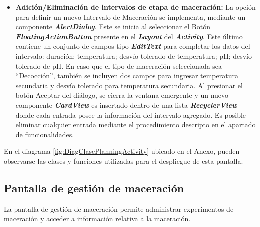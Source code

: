 \begin{itemize}
                    \item \textbf{Adición/Eliminación de intervalos de etapa de maceración:} La opción para definir un nuevo Intervalo de Maceración se implementa, mediante un componente \textbf{\textit{\gls{AlertDialog}}}. Este se inicia al seleccionar el Botón \textbf{\textit{\gls{FloatingActionButton}}} presente en el \textbf{\textit{\gls{Layout}}} del \textbf{\textit{\gls{Activity}}}. Este último contiene un conjunto de campos tipo \textbf{\textit{\gls{EditText}}} para completar los datos del intervalo: duración; temperatura; desvío tolerado de temperatura; pH; desvío tolerado de pH. En caso que el tipo de maceración seleccionada sea ``Decocción'', también se incluyen dos campos para ingresar temperatura secundaria y desvío tolerado para temperatura secundaria. Al presionar el botón Aceptar del diálogo, se cierra la ventana emergente y un nuevo componente \textbf{\textit{\gls{CardView}}} es insertado dentro de una lista \textbf{\textit{\gls{RecyclerView}}} donde cada entrada posee la información del intervalo agregado. Es posible eliminar cualquier entrada mediante el procedimiento descripto en el apartado de funcionalidades.
                \end{itemize}
                
                \par En el diagrama \ref{fig:DiagClasePlanningActivity} ubicado en el Anexo, pueden observarse las clases y funciones utilizadas para el despliegue de esta pantalla.
        
        \subsection{Pantalla de gestión de maceración}
        \label{DescripPantallaGestiónMaceración}
            \par La pantalla de gestión de maceración permite administrar experimentos de maceración y acceder a información relativa a la maceración.
            
